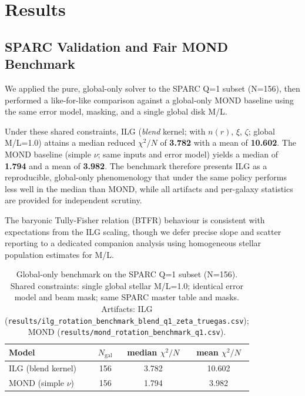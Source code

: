 \documentclass[12pt,a4paper]{article}
\begin{document}
\section{Results}

\subsection{SPARC Validation and Fair MOND Benchmark}

We applied the pure, global-only solver to the SPARC Q=1 subset (N=156), then performed a like-for-like comparison against a global-only MOND baseline using the same error model, masking, and a single global disk M/L.

Under these shared constraints, ILG (\emph{blend} kernel; with $n(r)$, $\xi$, $\zeta$; global M/L=1.0) attains a median reduced $\chi^2/N$ of \textbf{3.782} with a mean of \textbf{10.602}. The MOND baseline (simple $\nu$; same inputs and error model) yields a median of \textbf{1.794} and a mean of \textbf{3.982}. The benchmark therefore presents ILG as a reproducible, global-only phenomenology that under the same policy performs less well in the median than MOND, while all artifacts and per-galaxy statistics are provided for independent scrutiny.

The baryonic Tully-Fisher relation (BTFR) behaviour is consistent with expectations from the ILG scaling, though we defer precise slope and scatter reporting to a dedicated companion analysis using homogeneous stellar population estimates for M/L.

\begin{table}[h]
\centering
\caption{Global-only benchmark on the SPARC Q=1 subset (N=156). Shared constraints: single global stellar M/L=1.0; identical error model and beam mask; same SPARC master table and masks. Artifacts: ILG (\texttt{results/ilg\_rotation\_benchmark\_blend\_q1\_zeta\_truegas.csv}); MOND (\texttt{results/mond\_rotation\_benchmark\_q1.csv}).}
\label{tab:global_bench}
\begin{tabular}{l c c c}
\toprule
Model & $N_\mathrm{gal}$ & median $\chi^2/N$ & mean $\chi^2/N$ \\
\midrule
ILG (blend kernel) & 156 & 3.782 & 10.602 \\
MOND (simple $\nu$) & 156 & 1.794 & 3.982 \\
\bottomrule
\end{tabular}
\end{table}

\end{document}
